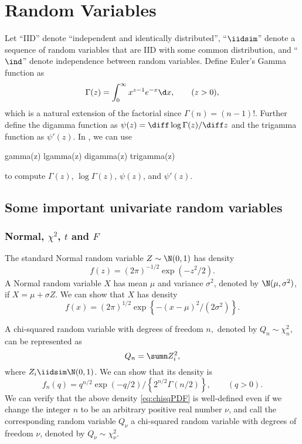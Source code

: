  
\chapter{Random Variables}\label{chapter:appendix-rvs}
 
Let ``IID'' denote ``independent and identically distributed'', ``$\iidsim$'' denote a sequence of random variables that are IID with some common distribution, and ``$\ind$'' denote independence between random variables. 
Define Euler's Gamma function as 
$$
\Gamma(z)=\int_{0}^{\infty}x^{z-1}e^{-x}\d x ,\qquad (z>0),
$$
which is a natural extension of the factorial since $\Gamma(n) = (n-1)!$. Further define
the digamma function  as  $\psi(z) = \diff \log  \Gamma (z) / \diff z$ and the trigamma function as $\psi'(z)$. 
In , we can use 
\begin{rc}
gamma(z)
lgamma(z)
digamma(z)
trigamma(z)
 \end{rc}
 to compute $\Gamma(z)$, $\log \Gamma(z)$, $\psi(z)$, and $\psi'(z)$. 
 
 

\section{Some important univariate random variables}

\subsection{Normal, $\chi^{2}$, $t$ and $F$}
The standard Normal random variable $Z\sim\N(0,1)$ has density 
\[
f(z)=(2\pi)^{-1/2}\exp\left(-z^{2}/2\right).
\]
A Normal random variable $X$ has mean $\mu$ and variance $\sigma^{2}$, denoted by $\N(\mu,\sigma^2)$, 
if $X=\mu+\sigma Z$. We can show that $X$ has density 
\[
f(x)=(2\pi)^{1/2}\exp\left\{ -(x-\mu)^{2}/(2\sigma^{2})\right\} .
\]

A chi-squared random variable with degrees of freedom $n,$ denoted
by $Q_{n}\sim\chi_{n}^{2},$ can be represented as 
$$
Q_{n}=\sumn Z_{i}^{2} , 
$$
where $Z_{i} \iidsim \N(0,1)$. We can show that its density is
\begin{equation}
f_{n}(q)=q^{n/2}\exp(-q/2)\Big/\left\{ 2^{n/2}\Gamma(n/2)\right\} ,\qquad(q>0).\label{eq:chisqPDF}
\end{equation}
We can verify that the above density \eqref{eq:chisqPDF} is well-defined even if we change
the integer $n$ to be an arbitrary positive real number $\nu$, and
call the corresponding random variable $Q_{\nu}$ a chi-squared random
variable with degrees of freedom $\nu$, denoted by $Q_\nu\sim \chi^2_\nu$.


